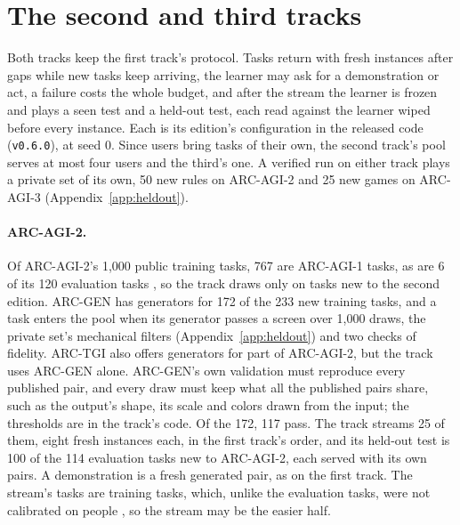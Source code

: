 \section{The second and third tracks}
\label{app:tracks}

Both tracks keep the first track's protocol. Tasks return with fresh instances after gaps while new tasks keep arriving, the learner may ask for a demonstration or act, a failure costs the whole budget, and after the stream the learner is frozen and plays a seen test and a held-out test, each read against the learner wiped before every instance. Each is its edition's configuration in the released code (\texttt{v0.6.0}), at seed 0. Since users bring tasks of their own, the second track's pool serves at most four users and the third's one. A verified run on either track plays a private set of its own, 50 new rules on ARC-AGI-2 and 25 new games on ARC-AGI-3 (Appendix~\ref{app:heldout}).

\paragraph{ARC-AGI-2.} Of ARC-AGI-2's 1,000 public training tasks, 767 are ARC-AGI-1 tasks, as are 6 of its 120 evaluation tasks \citep{chollet2025arcagi2}, so the track draws only on tasks new to the second edition. ARC-GEN \citep{moffitt2025arcgen} has generators for 172 of the 233 new training tasks, and a task enters the pool when its generator passes a screen over 1,000 draws, the private set's mechanical filters (Appendix~\ref{app:heldout}) and two checks of fidelity. ARC-TGI \citep{lehmann2026arctgi} also offers generators for part of ARC-AGI-2, but the track uses ARC-GEN alone. ARC-GEN's own validation must reproduce every published pair, and every draw must keep what all the published pairs share, such as the output's shape, its scale and colors drawn from the input; the thresholds are in the track's code. Of the 172, 117 pass. The track streams 25 of them, eight fresh instances each, in the first track's order, and its held-out test is 100 of the 114 evaluation tasks new to ARC-AGI-2, each served with its own pairs. A demonstration is a fresh generated pair, as on the first track. The stream's tasks are training tasks, which, unlike the evaluation tasks, were not calibrated on people \citep{chollet2025arcagi2}, so the stream may be the easier half.

